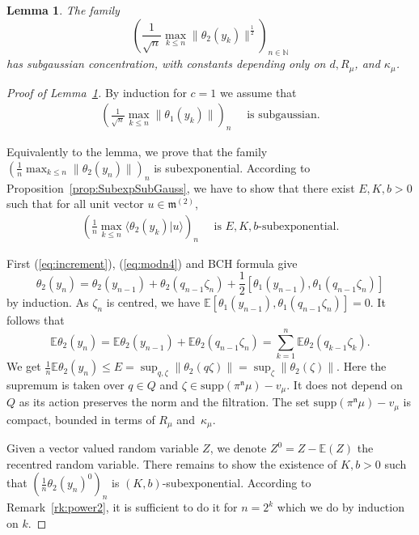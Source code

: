 \documentclass[11pt,leqno]{article}
\theoremstyle{plain}
\newtheorem{lemma}[theorem]{Lemma}
\theoremstyle{definition}
\theoremstyle{remark}
\numberwithin{equation}{section}
\newcommand{\E}{\mathbb{E}}
\begin{document}
 \begin{lemma}\label{lem:theta2}
 The family
 \[
\left(  \frac{1}{\sqrt{n}} \max_{k\le n} \|\theta_2(y_k)\|^{\frac{1}{2}} \right)_{n \in \mathbb{N}}
 \]
 has subgaussian concentration, with constants depending only on $d,R_\mu$, and $\kappa_\mu$.
 \end{lemma}




\begin{proof}[Proof of Lemma~\ref{lem:theta2}]
By induction for $c=1$ we assume that 
\begin{align}\label{eq:theta1}
\left( \frac{1}{\sqrt{n}}\max_{k\le n}\|\theta_1(y_k)\| \right)_n \quad  \textrm{ is subgaussian.}
\end{align}

Equivalently to the lemma, we prove that the family $\left(\frac{1}{n}\max_{k\le n}\|\theta_2(y_n)\|\right)_n$ is subexponential. According to Proposition~\ref{prop:SubexpSubGauss}, we have to show that there exist $E,K,b>0$ such that for all unit vector $u \in \mathfrak{m}^{(2)}$, 
\begin{align}\label{eq:scalu}
\left(\frac{1}{n} \max_{k \le n} \langle \theta_2(y_k) |u \rangle \right)_n \quad \textrm{ is }E,K,b\textrm{-subexponential.}
\end{align}

First (\ref{eq:increment}), (\ref{eq:modn4}) and BCH formula give
\[
\theta_2(y_n)=\theta_2(y_{n-1})+\theta_2(q_{n-1}\zeta_n)+\frac{1}{2}\left[\theta_1(y_{n-1}),\theta_1(q_{n-1}\zeta_n)\right]
\]
by induction.
As $\zeta_n$ is centred, we have $\mathbb{E}\left[\theta_1(y_{n-1}),\theta_1(q_{n-1}\zeta_n)\right]=0$. It follows that 
\[
\mathbb{E}\theta_2(y_n)=\mathbb{E}\theta_2(y_{n-1})+\mathbb{E}\theta_2(q_{n-1}\zeta_n)=\sum_{k=1}^n \mathbb{E}\theta_2(q_{k-1}\zeta_k).
\]
We get $\frac{1}{n}\mathbb{E}\theta_2(y_n) \le E=\sup_{q,\zeta}\|\theta_2(q\zeta)\|=\sup_\zeta\|\theta_2(\zeta)\|$. Here the supremum is taken over $q\in Q$ and $\zeta \in \mathrm{supp}(\pi^\mathfrak{n}\mu)-v_\mu$. It does not depend on $Q$ as its action preserves the norm and the filtration.  
The set $\mathrm{supp}(\pi^\mathfrak{n}\mu)-v_\mu$ is compact, bounded in terms of $R_\mu$ and~$\kappa_\mu$.

Given a vector valued random variable $Z$, we denote $Z^0=Z-\E(Z)$ the recentred random variable. There remains to show the existence of $K,b>0$ such that $\left(\frac{1}{n}\theta_2(y_n)^0\right)_n$ is $(K,b)$-subexponential. According to Remark~\ref{rk:power2}, it is sufficient to do it for $n=2^k$ which we do by induction on $k$. 


\end{proof}
\end{document}

